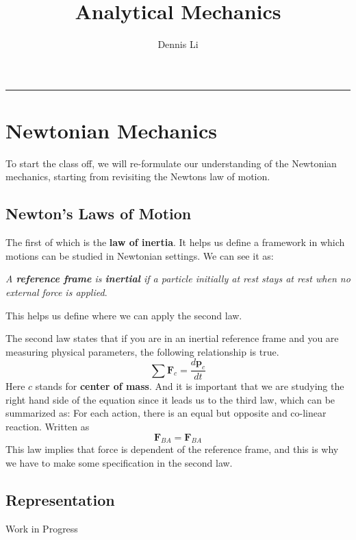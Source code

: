 \documentclass[12pt]{article}
\title{\textbf{Analytical Mechanics}}
\author{Dennis Li}
\newcommand{\dydx}[2]{\frac{d #1}{d #2}}
\begin{document}
\maketitle
\hrule


\section{Newtonian Mechanics}
To start the class off, we will re-formulate our understanding of the Newtonian mechanics, starting from revisiting the Newtons law of motion. 

\subsection{Newton's Laws of Motion}
The first of which is the \textbf{law of inertia}. It helps us define a framework in which motions can be studied in Newtonian settings. We can see it as: 

\textit{A \textbf{reference frame} is \textbf{inertial} if a particle initially at rest stays at rest when no external force is applied}. 


This helps us define where we can apply the second law.

The second law states that if you are in an inertial reference frame and you are measuring physical parameters, the following relationship is true.
\[
\sum \mathbf{F}_{c} = \dydx{\mathbf{p}_{c}}{t}
\]
Here $c$ stands for \textbf{center of mass}. And it is important that we are studying the right hand side of the equation since it leads us to the third law, which can be summarized as: For each action, there is an equal but opposite and co-linear reaction. Written as
\[
\mathbf{F}_{BA} = \mathbf{F}_{BA}
\]
This law implies that force is dependent of the reference frame, and this is why we have to make some specification in the second law. 


\subsection{Representation}
Work in Progress
\end{document}
